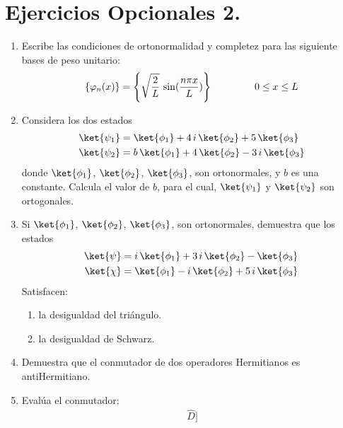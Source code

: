 \section{Ejercicios Opcionales 2.}
\begin{enumerate}
\item Escribe las condiciones de ortonormalidad y completez para las siguiente bases de peso unitario:
\begin{align*}
\left\{ \varphi_{n} (x) \right\} = \left\{ \sqrt{\dfrac{2}{L}} \, \sin (\dfrac{n \pi x}{L}) \right\} \hspace{1.5cm} 0 \leq x \leq L\end{align*}
\item Considera los dos estados
\begin{align*}
\ket{\psi_{1}} &= \ket{\phi_{1}} + 4 \, i \, \ket{\phi_{2}} + 5 \, \ket{\phi_{3}} \\
\ket{\psi_{2}} &= b \, \ket{\phi_{1}} + 4 \, \ket{\phi_{2}} - 3 \, i \, \ket{\phi_{3}}
\end{align*}
donde $\ket{\phi_{1}}$, $\ket{\phi_{2}}$, $\ket{\phi_{3}}$, son ortonormales, y $b$ es una constante. Calcula el valor de $b$, para el cual, $\ket{\psi_{1}}$ y $\ket{\psi_{2}}$ son ortogonales.
\item Si $\ket{\phi_{1}}$, $\ket{\phi_{2}}$, $\ket{\phi_{3}}$, son ortonormales, demuestra que los estados
\begin{align*}
\ket{\psi} &= i \, \ket{\phi_{1}} + 3 \, i \, \ket{\phi_{2}} - \ket{\phi_{3}} \\
\ket{\chi} &= \ket{\phi_{1}} - i \, \ket{\phi_{2}} + 5 \, i \, \ket{\phi_{3}}
\end{align*}
Satisfacen:
\begin{enumerate}[label=\alph*)]
\item la desigualdad del triángulo.
\item la desigualdad de Schwarz.
\end{enumerate}
\item Demuestra que el conmutador de dos operadores Hermitianos es antiHermitiano.
\item Evalúa el conmutador:
\begin{align*}
[ \hat{A}, [\hat{B}, \hat{C}] \, \hat{D} ]
\end{align*}
\end{enumerate}
